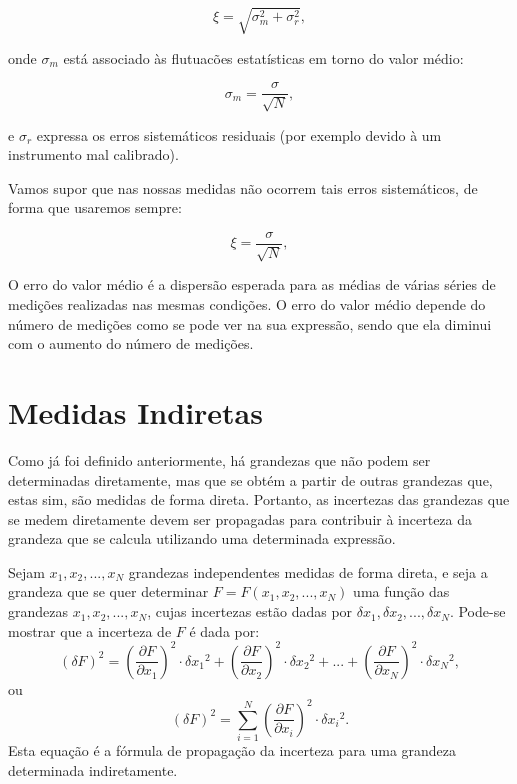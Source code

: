 \begin{enumerate}
\begin{equation}
\xi=\sqrt{\sigma_{m}^2 + \sigma_{r}^2},
\end{equation}

\noindent
onde $\sigma_{m}$ está associado às flutuacões estatísticas em torno do valor médio:

\begin{equation}
\sigma_{m}=\frac{\sigma}{\sqrt{N}},
\end{equation}

\noindent
e $\sigma_{r}$ expressa os erros sistemáticos residuais (por exemplo devido à um instrumento mal calibrado).

Vamos supor que nas nossas medidas não ocorrem tais erros sistemáticos, de forma que usaremos sempre:

\begin{equation}
\xi=\frac{\sigma}{\sqrt{N}},
\end{equation}


O erro do valor médio é a dispersão esperada para as médias de várias séries de medições realizadas nas mesmas condições. O erro do valor médio depende do número de medições como se pode ver na sua expressão, sendo que ela diminui com o aumento do número de medições.



\end{enumerate}

\section*{Medidas Indiretas}\label{prop}

Como j\'a foi definido anteriormente, h\'a grandezas que não podem ser determinadas diretamente, mas que se obt\'em a partir de outras grandezas que, estas sim, são medidas de forma direta. Portanto, as incertezas das grandezas que se medem diretamente devem ser propagadas para contribuir à incerteza da grandeza que se calcula utilizando uma determinada expressão.

Sejam $x_1, x_2, ... , x_N$ grandezas independentes medidas de forma direta, e seja a grandeza que se quer determinar $F = F (x_1, x_2, ..., x_N)$ uma função das grandezas $x_1, x_2, ... , x_N$, cujas incertezas estão dadas por $\delta{x_1}, \delta{x_2}, ... , \delta{x_N}$. Pode-se mostrar que a incerteza de $F$ é dada por: 
\begin{equation}
(\delta F)^2 = \left(\frac{\partial F}{\partial x_1}\right)^2 \cdot \delta{x_1}^2  +  \left(\frac{\partial F}{\partial x_2}\right)^2 \cdot \delta{x_2}^2 + ... +  \left(\frac{\partial F}{\partial x_N}\right)^2 \cdot \delta{x_N}^2,  
\end{equation}
\noindent
ou
\begin{equation}\label{eq:propag-geral}
(\delta F)^2 = \sum_{i = 1}^N \left(\frac{\partial F}{\partial x_i}\right)^2 \cdot \delta{x_i}^2 .
\end{equation}
Esta equação é a f\'ormula de propagação da incerteza para uma grandeza determinada indiretamente.%

